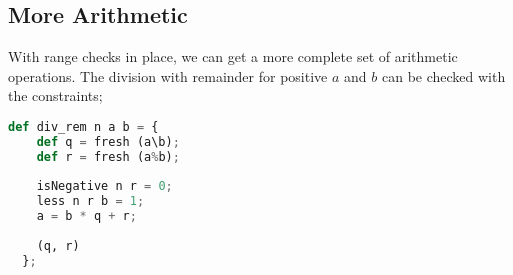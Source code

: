 \subsection{More Arithmetic}

With range checks in place, we can get a more complete set of arithmetic operations. The division with remainder for positive $a$ and $b$ can be checked with the constraints;

\begin{lstlisting}[language=Python]
  def div_rem n a b = {
    def q = fresh (a\b);
    def r = fresh (a%b);
    
    isNegative n r = 0;  
    less n r b = 1;
    a = b * q + r;
      
    (q, r)
  };
\end{lstlisting}

